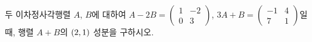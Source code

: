 두 이차정사각행렬 $A$, $B$에 대하여 $A-2B=\begin{pmatrix} 1 & -2 \\ 0 & 3 \end{pmatrix}$, $3A+B=\begin{pmatrix} -1 & 4 \\ 7 & 1 \end{pmatrix}$일 때, 행렬 $A+B$의 $(2{,}\mkern3mu\mathopen{}1)$ 성분을 구하시오.
